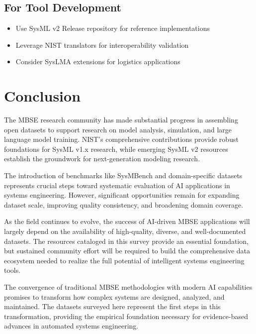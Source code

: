 \documentclass[11pt,a4paper]{article}
\begin{document}
\subsection{For Tool Development}
\begin{itemize}[leftmargin=*]
    \item Use SysML v2 Release repository for reference implementations
    \item Leverage NIST translators for interoperability validation
    \item Consider SysLMA extensions for logistics applications
\end{itemize}

\section{Conclusion}

The MBSE research community has made substantial progress in assembling open datasets to support research on model analysis, simulation, and large language model training. NIST's comprehensive contributions provide robust foundations for SysML v1.x research, while emerging SysML v2 resources establish the groundwork for next-generation modeling research.

The introduction of benchmarks like SysMBench and domain-specific datasets represents crucial steps toward systematic evaluation of AI applications in systems engineering. However, significant opportunities remain for expanding dataset scale, improving quality consistency, and broadening domain coverage.

As the field continues to evolve, the success of AI-driven MBSE applications will largely depend on the availability of high-quality, diverse, and well-documented datasets. The resources cataloged in this survey provide an essential foundation, but sustained community effort will be required to build the comprehensive data ecosystem needed to realize the full potential of intelligent systems engineering tools.

The convergence of traditional MBSE methodologies with modern AI capabilities promises to transform how complex systems are designed, analyzed, and maintained. The datasets surveyed here represent the first steps in this transformation, providing the empirical foundation necessary for evidence-based advances in automated systems engineering.
\end{document}
